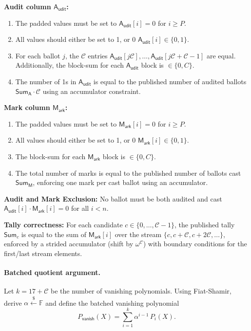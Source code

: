 \noindent\textbf{Audit column $\mathsf{A_{udit}}$:}
\begin{enumerate}
  \item The padded values must be set to $\mathsf{A_{udit}}[i]=0$ for $i\ge P$.
  \item All values should either be set to 1, or 0 $\mathsf{A_{udit}}[i]\in\{0,1\}$.
  \item For each ballot $j$, the $\mathcal{C}$ entries $\mathsf{A_{udit}}[j\mathcal{C}],\dots,\mathsf{A_{udit}}[j\mathcal{C}+\mathcal{C}-1]$ are equal.
  Additionally, the block-sum for each $\mathsf{A_{udit}}$ block is $\in\{0,C\}$.
  \item The number of 1s in $\mathsf{A_{udit}}$ is equal to the published number of audited ballots $\mathsf{Sum_A}\cdot \mathcal{C}$ using an accumulator constraint.
\end{enumerate}

\noindent\textbf{Mark column $\mathsf{M_{ark}}$:}
\begin{enumerate}
  \item The padded values must be set to $\mathsf{M_{ark}}[i]=0$ for $i\ge P$.
  \item All values should either be set to 1, or 0 $\mathsf{M_{ark}}[i]\in\{0,1\}$.
  \item The block-sum for each $\mathsf{M_{ark}}$ block is $\in\{0,C\}$.
  \item The total number of marks is equal to the published number of ballots cast $\mathsf{Sum_M}$, enforcing one mark per cast ballot using an accumulator.
\end{enumerate}

\noindent\textbf{Audit and Mark Exclusion:}
No ballot must be both audited and cast $\mathsf{A_{udit}}[i]\cdot \mathsf{M_{ark}}[i]=0$ for all $i < n$.

\noindent\textbf{Tally correctness:}
For each candidate $c\in\{0,\dots,\mathcal{C}-1\}$, the published tally $\mathsf{Sum}_c$ is equal to the sum of $\mathsf{M_{ark}}[i]$ over the
stream $\{c, c+\mathcal{C}, c+2\mathcal{C},\dots\}$, enforced by a strided accumulator (shift by $\omega^\mathcal{C}$) with boundary conditions
for the first/last stream elements.

\paragraph{Batched quotient argument.}
Let $k=17+\mathcal{C}$ be the number of vanishing polynomials. 
Using Fiat-Shamir, derive $\alpha \stackrel{\$}{\leftarrow} \mathbb{F}$ and define the batched vanishing polynomial
\begin{equation*}
P_{\mathsf{vanish}}(X)=\sum_{i=1}^{k}\alpha^{i-1}\,P_i(X).
\end{equation*}

